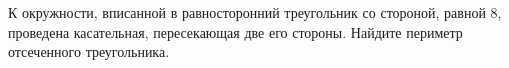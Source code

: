 \begin{ex}
	\begin{condition}
		К окружности, вписанной в равносторонний треугольник со стороной, равной \( 8 \), проведена касательная, пересекающая две его стороны. Найдите периметр отсеченного треугольника.
	\end{condition}
\end{ex}